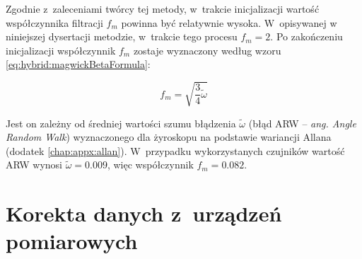 Zgodnie z~zaleceniami twórcy tej metody, w~trakcie inicjalizacji wartość współczynnika filtracji $f_m$ powinna być relatywnie wysoka. W~opisywanej w niniejszej dysertacji metodzie, w~trakcie tego procesu $f_m = 2$. Po zakończeniu inicjalizacji współczynnik $f_m$ zostaje wyznaczony według wzoru \ref{eq:hybrid:magwickBetaFormula}:

\begin{equation}
	f_m = \sqrt{\frac{3}{4}\widetilde{\omega}}
	\label{eq:hybrid:magwickBetaFormula}
\end{equation}

Jest on zależny od średniej wartości szumu błądzenia $\widetilde{\omega}$ (błąd ARW -- \emph{ang. Angle Random Walk}) wyznaczonego dla żyroskopu na podstawie wariancji Allana (dodatek \ref{chap:appx:allan}). W~przypadku wykorzystanych czujników wartość ARW wynosi $\widetilde{\omega} = 0.009$, więc współczynnik $f_m = 0.082$.

		
\section{Korekta danych z~urządzeń pomiarowych}
		
